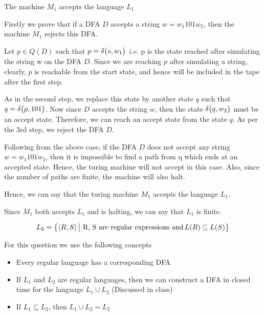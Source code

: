 \documentclass{article}
\begin{document}
\begin{question}
\begin{qpart}{1}
		\begin{qproof}{The machine $M_1$ accepts the language $L_1$}

			Firstly we prove that if a DFA $D$ accepts a string $w = w_1 101 w_2$, then the machine $M_1$ rejects this DFA. \br%

			Let $p \in Q(D)$ such that $p = \delta \big( s, w_1 \big)$ \textit{i.e.} p is the state reached after simulating the string w on the DFA $D$. Since we are reaching $p$ after simulating a string, clearly, $p$ is reachable from the start state, and hence will be included in the tape after the first step. \br%

			As in the second step, we replace this state by another state $q$ such that $q = \delta \big( p, 101 \big)$. Now since $D$ accepts the string $w$, then the state $\delta \big( q, w_2 \big)$ must be an accept state. Therefore, we can reach an accept state from the state $q$. As per the 3rd step, we reject the DFA $D$. \br%

			Following from the above case, if the DFA $D$ does not accept any string $w = w_1 101 w_2$, then it is impossible to find a path from q which ends at an accepted state. Hence, the turing machine will not accept in this case. Also, since the number of paths are finite, the machine will also halt. \br%

			Hence, we can say that the turing machine $M_1$ accepts the language $L_1$.
	
		\end{qproof}

		Since $M_1$ both accepts $L_1$ and is halting, we can say that $L_1$ is finite.

	\end{qpart}

	\begin{qpart}{2}

		\begin{align*}
			L_2 = \big\{ \langle R, S \rangle \,\big|\, \,\text{R, S are regular expressions and}\, L(R) \subseteq L(S) \big\}
		\end{align*}

		For this question we use the following concepts
		\begin{itemize}
			\item Every regular language has a corresponding DFA
			\item If $L_1$ and $L_2$ are regular languages, then we can construct a DFA in closed time for the language $L_1 \cup L_2$ (Discussed in class)
			\item If $L_1 \subseteq L_2$, then $L_1 \cup L_2 = L_2$
		\end{itemize}


\end{qpart}
\end{question}
\end{document}
